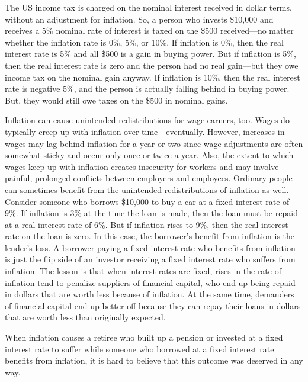 The US income tax is charged on the nominal interest received in dollar terms, without an adjustment for inflation. So, a person who invests \$10,000 and receives a 5\% nominal rate of interest is taxed on the \$500 received—no matter whether the inflation rate is 0\%, 5\%, or 10\%. If inflation is 0\%, then the real interest rate is 5\% and all \$500 is a gain in buying power. But if inflation is 5\%, then the real interest rate is zero and the person had no real gain—but they owe income tax on the nominal gain anyway. If inflation is 10\%, then the real interest rate is negative 5\%, and the person is actually falling behind in buying power. But, they would still owe taxes on the \$500 in nominal gains.

Inflation can cause unintended redistributions for wage earners, too. Wages do typically creep up with inflation over time—eventually. However, increases in wages may lag behind inflation for a year or two since wage adjustments are often somewhat sticky and occur only once or twice a year. Also, the extent to which wages keep up with inflation creates insecurity for workers and may involve painful, prolonged conflicts between employers and employees. 
Ordinary people can sometimes benefit from the unintended redistributions of inflation as well. Consider someone who borrows \$10,000 to buy a car at a fixed interest rate of 9\%. If inflation is 3\% at the time the loan is made, then the loan must be repaid at a real interest rate of 6\%. But if inflation rises to 9\%, then the real interest rate on the loan is zero. In this case, the borrower’s benefit from inflation is the lender’s loss. A borrower paying a fixed interest rate who benefits from inflation is just the flip side of an investor receiving a fixed interest rate who suffers from inflation. The lesson is that when interest rates are fixed, rises in the rate of inflation tend to penalize suppliers of financial capital, who end up being repaid in dollars that are worth less because of inflation. At the same time, demanders of financial capital end up better off because they can repay their loans in dollars that are worth less than originally expected.

When inflation causes a retiree who built up a pension or invested at a fixed interest rate to suffer while someone who borrowed at a fixed interest rate benefits from inflation, it is hard to believe that this outcome was deserved in any way. 

